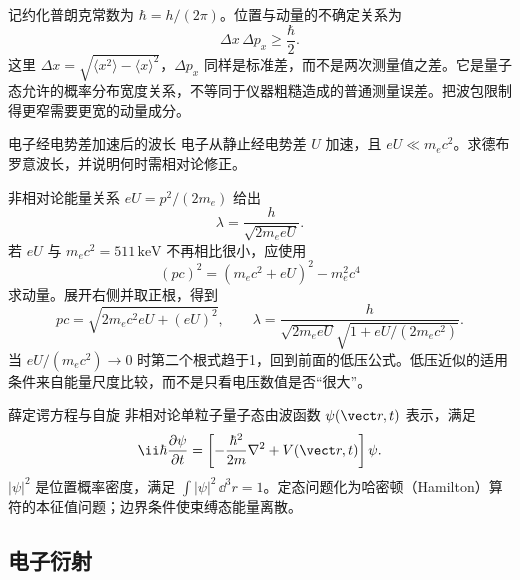 记约化普朗克常数为 $\hbar=h/(2\pi)$。位置与动量的不确定关系为
\begin{equation}
 \Delta x\,\Delta p_x\ge\frac\hbar2.
\end{equation}
这里 $\Delta x=\sqrt{\langle x^2\rangle-\langle x\rangle^2}$，$\Delta p_x$ 同样是标准差，而不是两次测量值之差。它是量子态允许的概率分布宽度关系，不等同于仪器粗糙造成的普通测量误差。把波包限制得更窄需要更宽的动量成分。

\begin{origexamplebox}{电子经电势差加速后的波长}
电子从静止经电势差 $U$ 加速，且 $eU\ll m_ec^2$。求德布罗意波长，并说明何时需相对论修正。
\end{origexamplebox}
\begin{xesolution}
非相对论能量关系 $eU=p^2/(2m_e)$ 给出
\[
 \boxed{\lambda=\frac h{\sqrt{2m_eeU}}}.
\]
若 $eU$ 与 $m_ec^2=511\,\mathrm{keV}$ 不再相比很小，应使用
\[
 (pc)^2=(m_ec^2+eU)^2-m_e^2c^4
\]
求动量。展开右侧并取正根，得到
\[
 pc=\sqrt{2m_ec^2eU+(eU)^2},\qquad
 \lambda=\frac{h}{\sqrt{2m_eeU}\sqrt{1+eU/(2m_ec^2)}}.
\]
当 $eU/(m_ec^2)\to0$ 时第二个根式趋于1，回到前面的低压公式。低压近似的适用条件来自能量尺度比较，而不是只看电压数值是否“很大”。
\end{xesolution}

\begin{starread}{薛定谔方程与自旋}
非相对论单粒子量子态由波函数 $\psi(\vect r,t)$ 表示，满足
\[
 \ii\hbar\frac{\partial\psi}{\partial t}
 =\left[-\frac{\hbar^2}{2m}\nabla^2+V(\vect r,t)\right]\psi.
\]
$|\psi|^2$ 是位置概率密度，满足 $\int |\psi|^2\,\dd^3r=1$。定态问题化为哈密顿（Hamilton）算符的本征值问题；边界条件使束缚态能量离散。


\end{starread}

\subsection{电子衍射}

